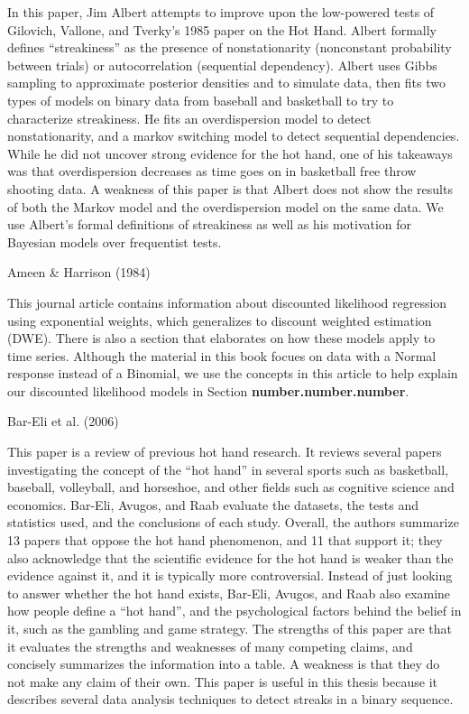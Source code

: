 \documentclass[12pt,twoside]{dukestatscithesis}
\theoremstyle{definition}
\theoremstyle{definition}
\theoremstyle{definition}
\theoremstyle{remark}
\begin{document}
In this paper, Jim Albert attempts to improve upon the low-powered tests
of Gilovich, Vallone, and Tverky's 1985 paper on the Hot Hand. Albert
formally defines ``streakiness'' as the presence of nonstationarity
(nonconstant probability between trials) or autocorrelation (sequential
dependency). Albert uses Gibbs sampling to approximate posterior
densities and to simulate data, then fits two types of models on binary
data from baseball and basketball to try to characterize streakiness. He
fits an overdispersion model to detect nonstationarity, and a markov
switching model to detect sequential dependencies. While he did not
uncover strong evidence for the hot hand, one of his takeaways was that
overdispersion decreases as time goes on in basketball free throw
shooting data. A weakness of this paper is that Albert does not show the
results of both the Markov model and the overdispersion model on the
same data. We use Albert's formal definitions of streakiness as well as
his motivation for Bayesian models over frequentist tests.

Ameen \& Harrison (1984)

This journal article contains information about discounted likelihood
regression using exponential weights, which generalizes to discount
weighted estimation (DWE). There is also a section that elaborates on
how these models apply to time series. Although the material in this
book focues on data with a Normal response instead of a Binomial, we use
the concepts in this article to help explain our discounted likelihood
models in Section \textbf{number.number.number}.

Bar-Eli et al. (2006)

This paper is a review of previous hot hand research. It reviews several
papers investigating the concept of the ``hot hand'' in several sports
such as basketball, baseball, volleyball, and horseshoe, and other
fields such as cognitive science and economics. Bar-Eli, Avugos, and
Raab evaluate the datasets, the tests and statistics used, and the
conclusions of each study. Overall, the authors summarize 13 papers that
oppose the hot hand phenomenon, and 11 that support it; they also
acknowledge that the scientific evidence for the hot hand is weaker than
the evidence against it, and it is typically more controversial. Instead
of just looking to answer whether the hot hand exists, Bar-Eli, Avugos,
and Raab also examine how people define a ``hot hand'', and the
psychological factors behind the belief in it, such as the gambling and
game strategy. The strengths of this paper are that it evaluates the
strengths and weaknesses of many competing claims, and concisely
summarizes the information into a table. A weakness is that they do not
make any claim of their own. This paper is useful in this thesis because
it describes several data analysis techniques to detect streaks in a
binary sequence.
\end{document}
